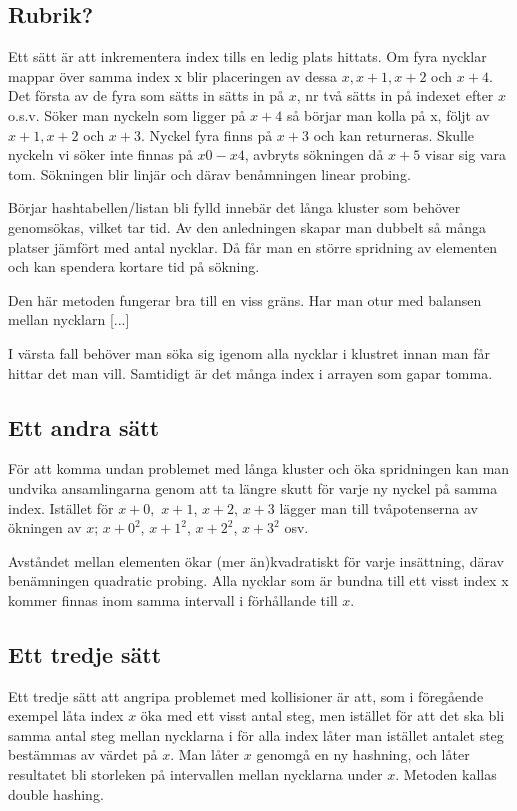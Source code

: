 \documentclass[a5paper,10pt,oneside]{article}
\begin{document}
\subsection*{Rubrik?}
Ett sätt är att inkrementera index tills en ledig plats hittats.
Om fyra nycklar mappar över samma index x blir placeringen av dessa $x, x+1, x+2$ och $x+4$. Det första av de fyra som sätts in sätts in på $x$, nr två sätts in på indexet efter $x$ o.s.v. 
Söker man nyckeln som ligger på $x + 4$ så börjar man kolla på x, följt av $x + 1, x + 2$ och $x+3$. Nyckel fyra finns på $x + 3$ och kan returneras. Skulle nyckeln vi söker inte finnas på $x0 - x4$, avbryts sökningen då $x + 5$ visar sig vara tom. Sökningen blir linjär och därav benåmningen linear probing.

 Börjar hashtabellen/listan bli fylld innebär det långa kluster som behöver genomsökas, vilket tar tid. Av den anledningen skapar man dubbelt så många platser jämfört med antal nycklar. Då får man en större spridning av elementen och kan spendera kortare tid på sökning.

Den här metoden fungerar bra till en viss gräns. Har man otur med balansen mellan nycklarn [...]


 I värsta fall behöver man söka sig igenom alla nycklar i klustret innan man får hittar det man vill. Samtidigt är det många index i arrayen som gapar tomma. 


\subsection*{Ett andra sätt}
För att komma undan problemet med långa kluster och öka spridningen kan man undvika ansamlingarna genom att ta längre skutt för varje ny nyckel på samma index.
Istället för $ x + 0,$  $x + 1$, $x + 2$, $x + 3$ lägger man till tvåpotenserna av ökningen av $x$;
$ x + {0}^{2} $, $ x + {1}^{2} $, $ x + {2}^{2} $, $ x + {3}^{2} $ osv.

Avståndet mellan elementen ökar (mer än)kvadratiskt för varje insättning, därav benämningen quadratic probing. Alla nycklar som är bundna till ett visst index x kommer finnas inom samma intervall i förhållande till $x$.

\subsection*{Ett tredje sätt}
Ett tredje sätt att angripa problemet med kollisioner är att, som i föregående exempel låta index $x$ öka med ett visst antal steg, men istället för att det ska bli samma antal steg mellan nycklarna i för alla index låter man istället antalet steg bestämmas av värdet på $x$.
Man låter $x$ genomgå en ny hashning, och låter resultatet bli storleken på intervallen mellan nycklarna under $x$. Metoden kallas double hashing.
\end{document}
